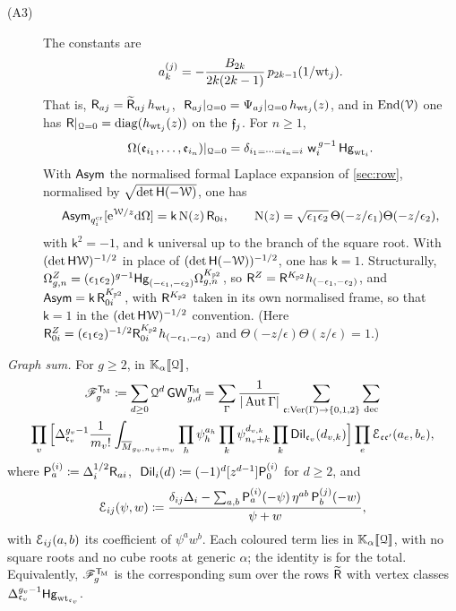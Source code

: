 \begin{thm}
\begin{description}
\item[(A3)] The constants are
\[
a_k^{(j)}=-\frac{B_{2k}}{2k(2k-1)}\,p_{2k-1}(1/\mathrm{wt}_j).
\]
That is, $\mathsf{R}_{aj}=\widetilde{\mathsf{R}}_{aj}\,h_{\mathrm{wt}_j}$, $\ \Rm_{aj}|_{\cQ=0}=\Psi_{aj}|_{\cQ=0}\,h_{\wts_j}(z)$, and in $\operatorname{End}(\mathcal{V})$ one has $\mathsf{R}|_{\mathcal{Q}=0}=\mathrm{diag}(h_{\mathrm{wt}_j}(z))$ on the $\mathfrak{f}_j$. For $n\geq 1$,
\[
\Omega(\eid_{i_1},\dots,\eid_{i_n})|_{\cQ=0}=\delta_{i_1=\dots=i_n=i}\ \wprod_i^{\,g-1}\,\Hg_{\wts_i}.
\]
With $\mathsf{Asym}$ the normalised formal Laplace expansion of \cref{sec:row}, normalised by $\sqrt{\det\mathsf{H}(-\mathcal{W})}$, one has
\[
\mathsf{Asym}_{q_i^{\mathrm{cr}}}[\mathrm{e}^{\mathcal{W}/z}\mathrm{d}\Omega]=\mathsf{k}\,\mathrm{N}(z)\,\mathsf{R}_{0i},\qquad \mathrm{N}(z)=\sqrt{\epsilon_1\epsilon_2}\,\Theta(-z/\epsilon_1)\Theta(-z/\epsilon_2),
\]
with $\mathsf{k}^2=-1$, and $\mathsf{k}$ universal up to the branch of the square root. With $(\det\mathsf{H}\mathcal{W})^{-1/2}$ in place of $(\det\mathsf{H}(-\mathcal{W}))^{-1/2}$, one has $\mathsf{k}=1$. Structurally, $\Omega^{Z}_{g,n}=(\epsilon_1\epsilon_2)^{g-1}\mathsf{Hg}_{(-\epsilon_1,-\epsilon_2)}\Omega^{K_{\mathbb{P}^2}}_{g,n}$, so $\mathsf{R}^{Z}=\mathsf{R}^{K_{\mathbb{P}^2}}h_{(-\epsilon_1,-\epsilon_2)}$, and $\mathsf{Asym}=\mathsf{k}\,\mathsf{R}^{K_{\mathbb{P}^2}}_{0i}$, with $\mathsf{R}^{K_{\mathbb{P}^2}}$ taken in its own normalised frame, so that $\mathsf{k}=1$ in the $(\det\mathsf{H}\mathcal{W})^{-1/2}$ convention. (Here $\mathsf{R}^{Z}_{0i}=(\epsilon_1\epsilon_2)^{-1/2}\mathsf{R}^{K_{\mathbb{P}^2}}_{0i}h_{(-\epsilon_1,-\epsilon_2)}$ and $\Theta(-z/\epsilon)\Theta(z/\epsilon)=1$.)
\end{description}

\emph{Graph sum.} For $g\geq2$, in $\mathbb{K}_{\alpha}[\![ \mathcal{Q} ]\!]$,
\begin{multline}
\mathscr{F}_g^{\mathsf{T}_{\!\mathrm{M}}}\coloneqq\sum_{d\geq0}\mathcal{Q}^d\,\mathsf{GW}_{g,d}^{\mathsf{T}_{\!\mathrm{M}}}
=\sum_{\Gamma}\frac{1}{|\operatorname{Aut}\Gamma|}\sum_{\mathfrak{c}:\mathrm{Ver}(\Gamma)\to\{0,1,2\}}\sum_{\mathrm{dec}}\\
\prod_{v}\Big[\Delta_{\mathfrak{c}_v}^{g_v-1}\frac{1}{m_v!}\int_{\overline{M}_{g_v,n_v+m_v}}\prod_h\psi_h^{a_h}\prod_k\psi_{n_v+k}^{d_{v,k}}\prod_k\mathsf{Dil}_{\mathfrak{c}_v}(d_{v,k})\Big]
\prod_{e}\mathcal{E}_{\mathfrak{c}\mathfrak{c}'}(a_e,b_e),
\label{eq:gen-graphsum}
\end{multline}
where $\mathsf{P}_a^{(i)}\coloneqq\Delta_i^{1/2}\mathsf{R}_{ai}$, $\ \Dil_i(d)\coloneqq(-1)^d[z^{d-1}]\Pn_0^{(i)}$ for $d\geq2$, and
\[
\mathcal{E}_{ij}(\psi,w)\coloneqq\frac{\delta_{ij}\Delta_i-\sum_{a,b}\mathsf{P}_a^{(i)}(-\psi)\,\eta^{ab}\,\mathsf{P}_b^{(j)}(-w)}{\psi+w},
\]
with $\mathcal{E}_{ij}(a,b)$ its coefficient of $\psi^aw^b$. Each coloured term lies in $\mathbb{K}_{\alpha}[\![ \mathcal{Q} ]\!]$, with no square roots and no cube roots at generic $\alpha$; the identity is for the total. Equivalently, $\mathscr{F}_g^{\mathsf{T}_{\!\mathrm{M}}}$ is the corresponding sum over the rows $\widetilde{\mathsf{R}}$ with vertex classes $\Delta_{\mathfrak{c}_v}^{g_v-1}\mathsf{Hg}_{\mathrm{wt}_{\mathfrak{c}_v}}$.
\end{thm}

